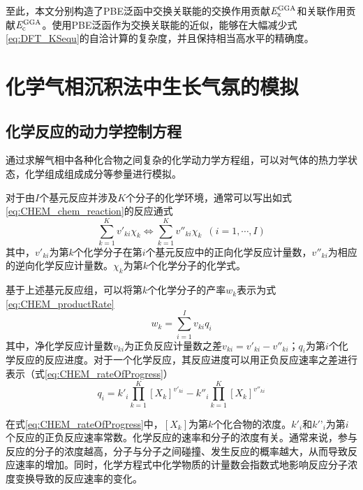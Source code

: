 至此，本文分别构造了PBE泛函中交换关联能的交换作用贡献$\it E_{\rm x}^{\rm GGA} \it$和关联作用贡献$\it E_{\rm c}^{\rm GGA} \it$。使用PBE泛函作为交换关联能的近似，能够在大幅减少式\eqref{eq:DFT_KSequ}的自洽计算的复杂度，并且保持相当高水平的精确度。
\section{化学气相沉积法中生长气氛的模拟}
\subsection{化学反应的动力学控制方程}
通过求解气相中各种化合物之间复杂的化学动力学方程组，可以对气体的热力学状态，化学组成组成成分等参量进行模拟。

对于由$I$个基元反应并涉及$K$个分子的化学环境，通常可以写出如式\eqref{eq:CHEM_chem_reaction}的反应通式
\begin{equation}
    \label{eq:CHEM_chem_reaction}
    \sum_{k=1}^Kv'_{ki}\chi_k\Leftrightarrow \sum_{k=1}^K v''_{ki}\chi_k\enspace\left(i=1,\cdots,I\right)
\end{equation}
其中，$v'_{ki}$为第$k$个化学分子在第$i$个基元反应中的正向化学反应计量数，$v''_{ki}$为相应的逆向化学反应计量数。$\chi_k$为第$k$个化学分子的化学式。

基于上述基元反应组，可以将第$k$个化学分子的产率$w_k$表示为式\eqref{eq:CHEM_productRate}\chinesecolon
\begin{equation}
    \label{eq:CHEM_productRate}
    w_k=\sum_{i=1}^Iv_{ki}q_i
\end{equation}
其中，净化学反应计量数$v_{ki}$为正负反应计量数之差$v_{ki}=v'_{ki}-v''_{ki}$；$q_i$为第$i$个化学反应的反应进度。对于一个化学反应，其反应进度可以用正负反应速率之差进行表示（式\eqref{eq:CHEM_rateOfProgress}）\chinesecolon
\begin{equation}
    \label{eq:CHEM_rateOfProgress}
    q_i=k'_i\prod_{k=1}^{K}\left[X_k\right]^{v'_{ki}}-k''_i\prod_{k=1}^{K}\left[X_k\right]^{v''_{ki}}
\end{equation}

在式\eqref{eq:CHEM_rateOfProgress}中，$\left[X_k\right]$为第$k$个化合物的浓度。$k'_i$和$k'’_i$为第$i$个反应的正负反应速率常数。化学反应的速率和分子的浓度有关。通常来说，参与反应的分子的浓度越高，分子与分子之间碰撞、发生反应的概率越大，从而导致反应速率的增加。同时，化学方程式中化学物质的计量数会指数式地影响反应分子浓度变换导致的反应速率的变化。

